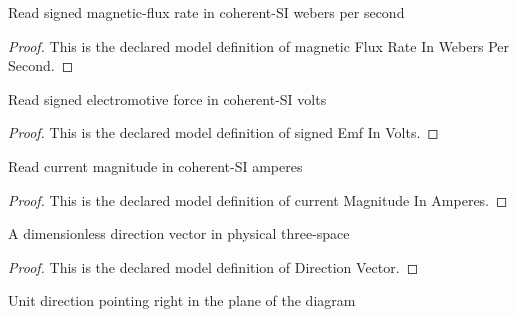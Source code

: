 \begin{definition}
  \label{def:physics:phyx-mini-0918:phyxminiproblems-problemphyxmini0918-magneticfluxrateinweberspersecond}
  Read signed magnetic-flux rate in coherent-SI webers per second
\end{definition}
\begin{proof}
  This is the declared model definition of magnetic Flux Rate In Webers Per Second.
\end{proof}
\begin{definition}
  \label{def:physics:phyx-mini-0918:phyxminiproblems-problemphyxmini0918-signedemfinvolts}
  Read signed electromotive force in coherent-SI volts
\end{definition}
\begin{proof}
  This is the declared model definition of signed Emf In Volts.
\end{proof}
\begin{definition}
  \label{def:physics:phyx-mini-0918:phyxminiproblems-problemphyxmini0918-currentmagnitudeinamperes}
  Read current magnitude in coherent-SI amperes
\end{definition}
\begin{proof}
  This is the declared model definition of current Magnitude In Amperes.
\end{proof}
\begin{definition}
  \label{def:physics:phyx-mini-0918:phyxminiproblems-problemphyxmini0918-directionvector}
  A dimensionless direction vector in physical three-space
\end{definition}
\begin{proof}
  This is the declared model definition of Direction Vector.
\end{proof}
\begin{definition}
  \label{def:physics:phyx-mini-0918:phyxminiproblems-problemphyxmini0918-rightwardunitvector}
  Unit direction pointing right in the plane of the diagram
\end{definition}
